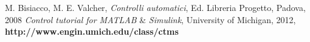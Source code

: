 
%


\begin{thebibliography}{9} 
 M. Bisiacco, M. E. Valcher, \textit{Controlli automatici}, Ed. Libreria Progetto, Padova, 2008
 \textit{Control tutorial for MATLAB} \& \textit{Simulink}, University of Michigan, 2012,   \textbf{http://www.engin.umich.edu/class/ctms}
\end{thebibliography}